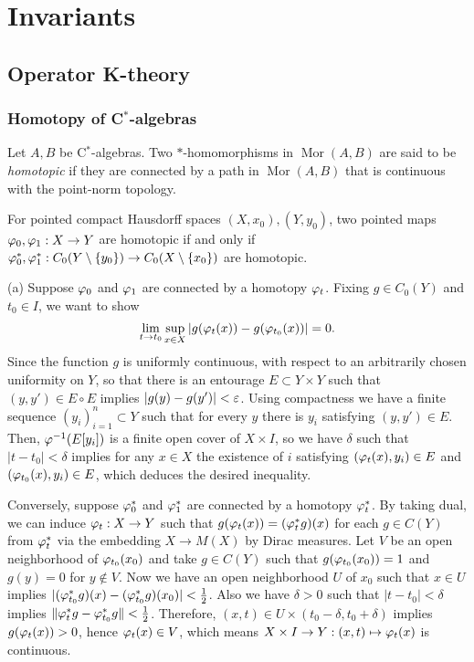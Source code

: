 \documentclass{../../large}
\DeclareMathOperator{\Mor}{Mor}
\begin{document}
\part{Invariants}
\chapter{Operator K-theory}

\section{Homotopy of C$^*$-algebras}

\begin{prb}
Let $A,B$ be C$^*$-algebras.
Two $*$-homomorphisms in $\Mor(A,B)$ are said to be \emph{homotopic} if they are connected by a path in $\Mor(A,B)$ that is continuous with the point-norm topology.
\begin{parts}
\item For pointed compact Hausdorff spaces $(X,x_0),(Y,y_0)$, two pointed maps $\varphi_0,\varphi_1:X\to Y$ are homotopic if and only if $\varphi_0^*,\varphi_1^*:C_0(Y\setminus\{y_0\})\to C_0(X\setminus\{x_0\})$ are homotopic.
\end{parts}
\end{prb}
\begin{pf}
(a)
Suppose $\varphi_0$ and $\varphi_1$ are connected by a homotopy $\varphi_t$.
Fixing $g\in C_0(Y)$ and $t_0\in I$, we want to show
\[\lim_{t\to t_0}\sup_{x\in X}|g(\varphi_t(x))-g(\varphi_{t_0}(x))|=0.\]
Since the function $g$ is uniformly continuous, with respect to an arbitrarily chosen uniformity on $Y$, so that there is an entourage $E\subset Y\times Y$ such that $(y,y')\in E\circ E$ implies $|g(y)-g(y')|<\varepsilon$.
Using compactness we have a finite sequence $(y_i)_{i=1}^n\subset Y$ such that for every $y$ there is $y_i$ satisfying $(y,y')\in E$.
Then, $\varphi^{-1}(E[y_i])$ is a finite open cover of $X\times I$, so we have $\delta$ such that $|t-t_0|<\delta$ implies for any $x\in X$ the existence of $i$ satisfying $(\varphi_t(x),y_i)\in E$ and $(\varphi_{t_0}(x),y_i)\in E$, which deduces the desired inequality.

Conversely, suppose $\varphi_0^*$ and $\varphi_1^*$ are connected by a homotopy $\varphi_t^*$.
By taking dual, we can induce $\varphi_t:X\to Y$ such that $g(\varphi_t(x))=(\varphi_t^*g)(x)$ for each $g\in C(Y)$ from $\varphi_t^*$ via the embedding $X\to M(X)$ by Dirac measures.
Let $V$ be an open neighborhood of $\varphi_{t_0}(x_0)$ and take $g\in C(Y)$ such that $g(\varphi_{t_0}(x_0))=1$ and $g(y)=0$ for $y\notin V$.
Now we have an open neighborhood $U$ of $x_0$ such that $x\in U$ implies $|(\varphi_{t_0}^*g)(x)-(\varphi_{t_0}^*g)(x_0)|<\frac12$.
Also we have $\delta>0$ such that $|t-t_0|<\delta$ implies $\|\varphi_t^*g-\varphi_{t_0}^*g\|<\frac12$.
Therefore, $(x,t)\in U\times(t_0-\delta,t_0+\delta)$ implies $g(\varphi_t(x))>0$, hence $\varphi_t(x)\in V$, which means $X\times I\to Y:(x,t)\mapsto\varphi_t(x)$ is continuous.
\end{pf}
\end{document}
